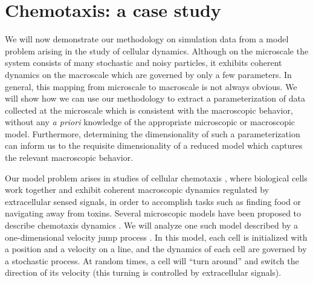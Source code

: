 \documentclass[preprint]{elsarticle}
\begin{document}
\section{Chemotaxis: a case study}

We will now demonstrate our methodology on simulation data from a model problem arising in the study of cellular dynamics. 
%
Although on the microscale the system consists of many stochastic and noisy particles, it exhibits coherent dynamics on the macroscale which are governed by only a few parameters.
%
In general, this mapping from microscale to macroscale is not always obvious.
%
We will show how we can use our methodology to extract a parameterization of data collected at the microscale which is consistent with the macroscopic behavior, without any {\em a priori} knowledge of the appropriate microscopic or macroscopic model.
%
Furthermore, determining the dimensionality of such a parameterization can inform us to the requisite dimensionality of a reduced model which captures the relevant macroscopic behavior. 


%

%
%

Our model problem arises in studies of cellular chemotaxis \cite{othmer2000diffusion}, where 
biological cells work together and exhibit coherent macroscopic dynamics regulated by extracellular sensed signals, in order to accomplish tasks such as finding food or navigating away from toxins.
%
Several microscopic models have been proposed to describe chemotaxis dynamics \cite{othmer1988models, codling2008random}.
%
We will analyze one such model described by a one-dimensional velocity jump process \cite{othmer2000diffusion}.
%
In this model, each cell is initialized with a position and a velocity on a line, and the dynamics of each cell are governed by a stochastic process.
%
At random times, a cell will ``turn around'' and switch the direction of its velocity (this turning is controlled by extracellular signals). 
%
\end{document}
